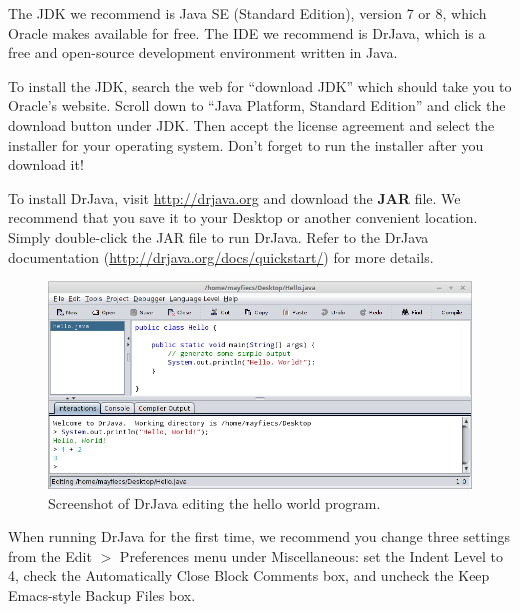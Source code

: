 \documentclass[12pt]{book}
\theoremstyle{exercise}
\begin{document}
The JDK we recommend is Java SE (Standard Edition), version 7 or 8, which Oracle makes available for free.
The IDE we recommend is DrJava, which is a free and open-source development environment written in Java.

To install the JDK, search the web for ``download JDK'' which should take you to Oracle's website.
Scroll down to ``Java Platform, Standard Edition'' and click the download button under JDK.
Then accept the license agreement and select the installer for your operating system.
Don't forget to run the installer after you download it!


To install DrJava, visit \url{http://drjava.org} and download the {\bf JAR} file.
We recommend that you save it to your Desktop or another convenient location.
Simply double-click the JAR file to run DrJava.
Refer to the DrJava documentation (\url{http://drjava.org/docs/quickstart/}) for more details.

\begin{figure}[!ht]
\begin{center}
\includegraphics[width=\textwidth]{figs/drjava-hello.png}
\caption{Screenshot of DrJava editing the hello world program.}
\label{fig.drjava1}
\end{center}
\end{figure}

When running DrJava for the first time, we recommend you change three settings from the {\sf Edit $>$ Preferences} menu under {\sf Miscellaneous}: set the {\sf Indent Level} to 4, check the {\sf Automatically Close Block Comments} box, and uncheck the {\sf Keep Emacs-style Backup Files} box.


\end{document}
